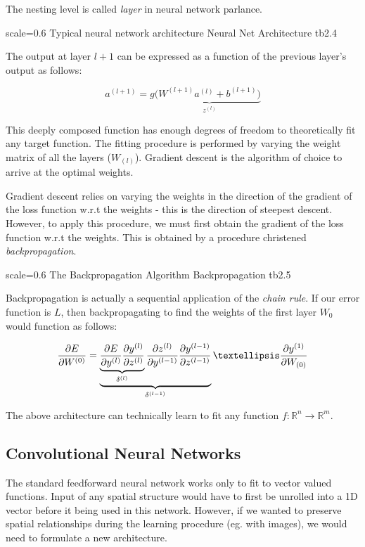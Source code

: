 The nesting level is called \emph{layer} in neural network parlance. 

{scale=0.6}%
{Typical neural network architecture}%
{Neural Net Architecture}%
{tb2.4} %

The output at layer $l+1$ can be expressed as a function of the previous layer's output as follows:

\[a^{(l+1)} = g(\underbrace{W^{(l+1)}a^{(l)} + b^{(l+1)})}_{z^{(l)}}\]

This deeply composed function has enough degrees of freedom to theoretically fit any target function. The fitting procedure is performed by varying the weight matrix of all the layers ($W_{(l)}$). Gradient descent is the algorithm of choice to arrive at the optimal weights.

Gradient descent relies on varying the weights in the direction of the gradient of the loss function w.r.t the weights - this is the direction of steepest descent. However, to apply this procedure, we must first obtain the gradient of the loss function w.r.t the weights. This is obtained by a procedure christened \emph{backpropagation}.

{scale=0.6}%
{The Backpropagation Algorithm}%
{Backpropagation}%
{tb2.5} %

Backpropagation is actually a sequential application of the \emph{chain rule}. 
If our error function is $L$, then backpropagating to find the weights of the first layer $W_0$ would function as follows:

\[\frac{\partial E}{\partial W^{(0)}} =  \underbrace{\underbrace{\frac{\partial E}{\partial y^{(l)}} \frac{\partial y^{(l)}}{\partial z^{(l)}}}_{\delta^{(l)}} \frac{\partial z^{(l)}}{\partial y^{(l-1)}} \frac{\partial y^{(l-1)}}{\partial z^{(l-1)}}}_{\delta^{(l-1)}} \textellipsis \frac{\partial y^{(1)}}{\partial W_{(0)}}\]

The above architecture can technically learn to fit any function 
$f: \mathbb{R}^n \rightarrow \mathbb{R}^m $.

\subsection{Convolutional Neural Networks}
The standard feedforward neural network works only to fit to vector valued functions. Input of any spatial structure would have to first be unrolled into a 1D vector before it being used in this network. However, if we wanted to preserve spatial relationships during the learning procedure (eg. with images), we would need to formulate a new architecture.

